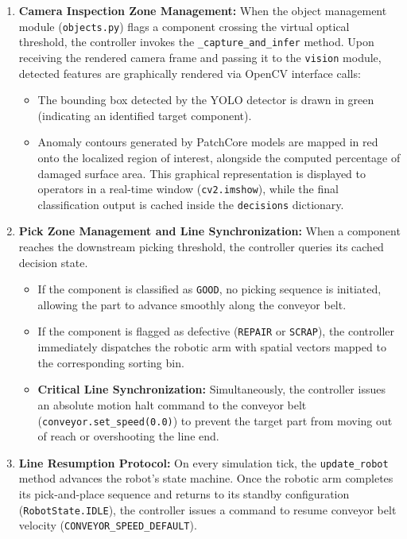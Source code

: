 \documentclass{article}
\begin{document}
\begin{enumerate}
	\item \textbf{Camera Inspection Zone Management:}
	When the object management module (\texttt{objects.py}) flags a component crossing the virtual optical threshold, the controller invokes the \texttt{\_capture\_and\_infer} method. Upon receiving the rendered camera frame and passing it to the \texttt{vision} module, detected features are graphically rendered via OpenCV interface calls:
	\begin{itemize}
		\item The bounding box detected by the YOLO detector is drawn in green (indicating an identified target component).
		\item Anomaly contours generated by PatchCore models are mapped in red onto the localized region of interest, alongside the computed percentage of damaged surface area. This graphical representation is displayed to operators in a real-time window (\texttt{cv2.imshow}), while the final classification output is cached inside the \texttt{decisions} dictionary.
	\end{itemize}
	
	\item \textbf{Pick Zone Management and Line Synchronization:}
	When a component reaches the downstream picking threshold, the controller queries its cached decision state.
	\begin{itemize}
		\item If the component is classified as \texttt{GOOD}, no picking sequence is initiated, allowing the part to advance smoothly along the conveyor belt.
		\item If the component is flagged as defective (\texttt{REPAIR} or \texttt{SCRAP}), the controller immediately dispatches the robotic arm with spatial vectors mapped to the corresponding sorting bin.
		\item \textbf{Critical Line Synchronization:} Simultaneously, the controller issues an absolute motion halt command to the conveyor belt (\texttt{conveyor.set\_speed(0.0)}) to prevent the target part from moving out of reach or overshooting the line end.
	\end{itemize}
	
	\item \textbf{Line Resumption Protocol:}
	On every simulation tick, the \texttt{update\_robot} method advances the robot's state machine. Once the robotic arm completes its pick-and-place sequence and returns to its standby configuration (\texttt{RobotState.IDLE}), the controller issues a command to resume conveyor belt velocity (\texttt{CONVEYOR\_SPEED\_DEFAULT}).
\end{enumerate}
\end{document}
